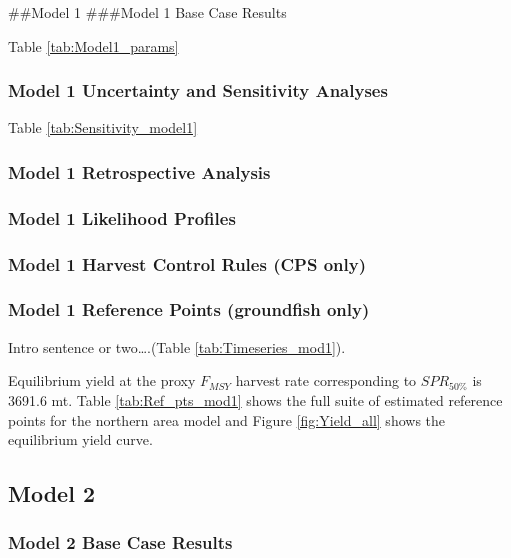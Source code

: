 \documentclass[12pt,]{article}
\begin{document}
\clearpage
 \#\#Model 1 \#\#\#Model 1 Base Case Results

Table \ref{tab:Model1_params}

\subsubsection{Model 1 Uncertainty and Sensitivity
Analyses}\label{model-1-uncertainty-and-sensitivity-analyses}

Table \ref{tab:Sensitivity_model1}

\subsubsection{Model 1 Retrospective
Analysis}\label{model-1-retrospective-analysis}

\subsubsection{Model 1 Likelihood
Profiles}\label{model-1-likelihood-profiles}

\subsubsection{Model 1 Harvest Control Rules (CPS
only)}\label{model-1-harvest-control-rules-cps-only}

\subsubsection{Model 1 Reference Points (groundfish
only)}\label{model-1-reference-points-groundfish-only}

Intro sentence or two\ldots{}.(Table \ref{tab:Timeseries_mod1}).

Equilibrium yield at the proxy \(F_{MSY}\) harvest rate corresponding to
\(SPR_{50\%}\) is 3691.6 mt. Table \ref{tab:Ref_pts_mod1} shows the full
suite of estimated reference points for the northern area model and
Figure \ref{fig:Yield_all} shows the equilibrium yield curve.

\clearpage

\subsection{Model 2}\label{model-2}

\subsubsection{Model 2 Base Case
Results}\label{model-2-base-case-results}
\end{document}
